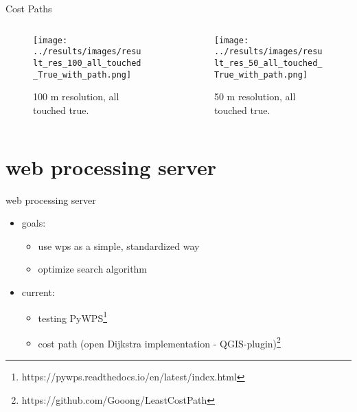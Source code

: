 \documentclass[usenames,dvipsnames,aspectratio=169]{beamer}
\begin{document}
\begin{frame}{Cost Paths}
	\begin{columns}[T] %
		\begin{column}{.48\textwidth}
			\begin{figure}[htb]
				\texttt{[image: ../results/images/result\_res\_100\_all\_touched\_True\_with\_path.png]}
				\caption{100 m resolution, all touched true.}
			\end{figure}
		\end{column}
		\begin{column}{.48\textwidth}
			\begin{figure}[htb]
				\texttt{[image: ../results/images/result\_res\_50\_all\_touched\_True\_with\_path.png]}
				\caption{50 m resolution, all touched true.}
			\end{figure}
		\end{column}
	\end{columns}
\end{frame}

\section{web processing server}
\begin{frame}{web processing server}
	\begin{itemize}
		\item goals: 
		\begin{itemize}
			\item use wps as a simple, standardized way
			\item optimize search algorithm
		\end{itemize}
		\item current: 
		\begin{itemize}
			\item testing PyWPS\footnote{https://pywps.readthedocs.io/en/latest/index.html}
			\item cost path (open Dijkstra implementation - QGIS-plugin)\footnote{https://github.com/Gooong/LeastCostPath}
		\end{itemize}
	\end{itemize}
\end{frame}
\end{document}
